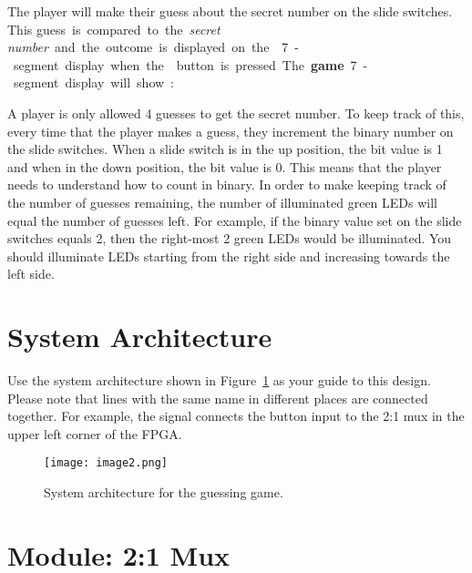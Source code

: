 The player will make their guess about the secret number on the
 slide switches. This \qty{guess} is compared to the
\emph{secret number} and the outcome is displayed on the 
7-segment display when the  button is pressed. The
\textbf{game} 7-segment display will show:


A player is only allowed 4 guesses to get the secret number. To
keep track of this, every time that the player makes a guess, they
increment the binary number on the  slide switches. When a
slide switch is in the up position, the bit value is 1 and when in the
down position, the bit value is 0. This means that the player needs to
understand how to count in binary. In order to make keeping track of the
number of guesses remaining, the number of illuminated green
 LEDs will equal the number of guesses left. For
example, if the binary value set on the  slide switches
equals 2, then the right-most 2 green LEDs would be
illuminated. You should illuminate LEDs starting from the right side and
increasing towards the left side.

\section{System Architecture}
Use the system architecture shown in Figure~\ref{fig:guessGameSysArch} as your
guide to this design. Please note that lines with the same name in different places 
are connected together. For example, the signal  connects the button input to the 2:1 mux in the upper left corner of  the FPGA.

\begin{figure}[ht]
\texttt{[image: image2.png]}
\caption{System architecture for the guessing game.}
\label{fig:guessGameSysArch}
\end{figure}

\section{Module: 2:1 Mux}

